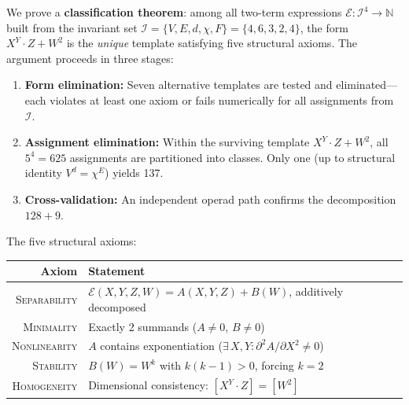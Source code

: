 \documentclass[11pt,a4paper]{article}
\begin{document}
We prove a \textbf{classification theorem}: among all two-term expressions
$\mathcal{E}: \mathcal{I}^4 \to \mathbb{N}$ built from the invariant set
$\mathcal{I} = \{V, E, d, \chi, F\} = \{4, 6, 3, 2, 4\}$, the form
$X^Y \cdot Z + W^2$ is the \emph{unique} template satisfying five
structural axioms. The argument proceeds in three stages:

\begin{enumerate}
\item \textbf{Form elimination:} Seven alternative templates are tested and
  eliminated---each violates at least one axiom or fails numerically for all
  assignments from $\mathcal{I}$.
\item \textbf{Assignment elimination:} Within the surviving template
  $X^Y \cdot Z + W^2$, all $5^4 = 625$ assignments are partitioned into
  classes. Only one (up to structural identity $V^d = \chi^E$) yields 137.
\item \textbf{Cross-validation:} An independent operad path confirms the
  decomposition $128 + 9$.
\end{enumerate}

\noindent The five structural axioms:
\begin{center}
\begin{tabular}{rp{11cm}}
\toprule
\textbf{Axiom} & \textbf{Statement} \\
\midrule
\textsc{Separability} & $\mathcal{E}(X,Y,Z,W) = A(X,Y,Z) + B(W)$, additively decomposed \\
\textsc{Minimality}   & Exactly 2 summands ($A \neq 0$, $B \neq 0$) \\
\textsc{Nonlinearity} & $A$ contains exponentiation ($\exists\, X,Y: \partial^2 A / \partial X^2 \neq 0$) \\
\textsc{Stability}    & $B(W) = W^k$ with $k(k-1) > 0$, forcing $k = 2$ \\
\textsc{Homogeneity}  & Dimensional consistency: $[X^Y \cdot Z] = [W^2]$ \\
\bottomrule
\end{tabular}
\end{center}
\end{document}
